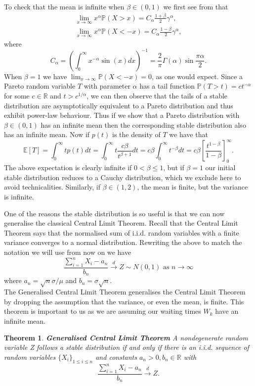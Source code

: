 \documentclass[honours,12pt]{unswthesis}
\newcommand{\R}{\mathbb{R}}
\newcommand{\PP}{\mathbb{P}}
\newcommand{\E}{\mathbb{E}}
\newcommand{\1}{\mathbf 1}
\newtheorem{theorem}[equation]{Theorem}
\numberwithin{equation}{section}
\theoremstyle{definition}
\theoremstyle{remark}
\begin{document}
\noindent To check that the mean is infinite when $\beta \in (0,1)$ we first see from \cite{JanickiWeron1994} that 
\begin{align}
\lim_{x\to\infty} x^\alpha\PP(X>x)=C_\alpha\frac{1+\beta}{2}\gamma^\alpha,\\
\lim_{x\to\infty} x^\alpha\PP(X<-x)=C_\alpha\frac{1-\beta}{2}\gamma^\alpha,
\end{align}
\noindent where
\[
	C_\alpha=\left(\int^\infty_0 x^{-\alpha} \sin(x) dx  \right)^{-1}=\frac{2}{\pi}\Gamma(\alpha)\sin\frac{\pi\alpha}{2}.
\]
\noindent When $\beta=1$ we have $\lim_{x\to\infty}\PP(X<-x)=0$, as one would expect. Since a Pareto random variable $T$ with parameter $\alpha$ has a tail function $\PP(T>t)=ct^{-\alpha}$ for some $c\in \R$ and $t>c^{1/\alpha}$, we can then observe that the tails of a stable distribution are asymptotically equivalent to a Pareto distribution and thus exhibit power-law behaviour. 
Thus if we show that a Pareto distribution with $\beta \in (0,1)$ has an infinite mean then the corresponding stable distribution also has an infinite mean. Now if $p(t)$ is the density of $T$ we have that 
\[
	\E[T]=\int^\infty_0 tp(t)dt = \int^\infty_0 t\frac{c\beta}{t^{\beta+1}}dt = c\beta\int^\infty_0 t^{-\beta}dt = c\beta \left[\frac{t^{1-\beta}}{1-\beta}\right]^\infty_0.
\]
The above expectation is clearly infinite if $0<\beta\leq1$, but if $\beta=1$ our initial stable distribution reduces to a Cauchy distribution, which we exclude here to avoid technicalities.
Similarly, if $\beta \in (1,2)$, the mean is finite, but the variance is infinite.


One of the reasons the stable distribution is so useful is that we can now generalise the classical Central Limit Theorem. Recall that the Central Limit Theorem says that the normalised sum of i.i.d. random variables with a finite variance converges to a normal distribution. Rewriting the above to match the notation we will use from now on we have
\[
	\frac{\sum^n_{i=1}X_i-a_n}{b_n} \overset{d}{\to}Z \sim N(0,1) \textrm{ as $n\to\infty$}
\]
where $a_n=\sqrt{n}\sigma/\mu$ and $b_n=\sigma\sqrt{n}.$\\

\noindent The Generalised Central Limit Theorem generalises the Central Limit Theorem by dropping the assumption that the variance, or even the mean, is finite. This theorem is important to us as we are assuming our waiting times $W_k$ have an infinite mean.\\

\begin{theorem}\cite{Nolan2015}\label{th:gclt}
\textbf{Generalised Central Limit Theorem} A nondegenerate random variable Z follows a stable distribution if and only if there is an i.i.d. sequence of random variables $\{X_i\}_{1\leq i \leq n}$  and constants $a_n>0, b_n \in \R$ with 
\[
	\frac{\sum^n_{i=1}X_i-a_n}{b_n} \overset{d}{\longrightarrow}Z.
\]
\end{theorem}
\end{document}
